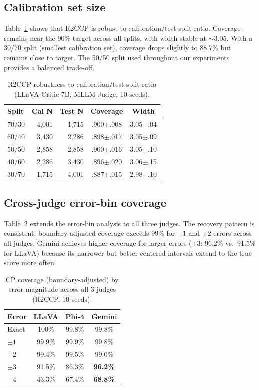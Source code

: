 \documentclass{article}
\begin{document}
\subsection{Calibration set size}
\label{app:split}

Table~\ref{tab:ablation_split} shows that R2CCP is robust to calibration/test split ratio. Coverage remains near the 90\% target across all splits, with width stable at ${\sim}3.05$. With a 30/70 split (smallest calibration set), coverage drops slightly to 88.7\% but remains close to target. The 50/50 split used throughout our experiments provides a balanced trade-off.

\begin{table}[t]
\centering
\caption{R2CCP robustness to calibration/test split ratio (LLaVA-Critic-7B, MLLM-Judge, 10 seeds).}
\label{tab:ablation_split}
\small
\begin{tabular}{lrrcc}
\toprule
\textbf{Split} & \textbf{Cal N} & \textbf{Test N} & \textbf{Coverage} & \textbf{Width} \\
\midrule
70/30 & 4,001 & 1,715 & .900$\pm$.008 & 3.05$\pm$.04 \\
60/40 & 3,430 & 2,286 & .898$\pm$.017 & 3.05$\pm$.09 \\
50/50 & 2,858 & 2,858 & .900$\pm$.016 & 3.05$\pm$.10 \\
40/60 & 2,286 & 3,430 & .896$\pm$.020 & 3.06$\pm$.15 \\
30/70 & 1,715 & 4,001 & .887$\pm$.015 & 2.98$\pm$.10 \\
\bottomrule
\end{tabular}
\end{table}

\subsection{Cross-judge error-bin coverage}
\label{app:cross_judge_errors}

Table~\ref{tab:error_bins_all} extends the error-bin analysis to all three judges. The recovery pattern is consistent: boundary-adjusted coverage exceeds 99\% for $\pm 1$ and $\pm 2$ errors across all judges. Gemini achieves higher coverage for larger errors ($\pm 3$: 96.2\% vs.\ 91.5\% for LLaVA) because its narrower but better-centered intervals extend to the true score more often.

\begin{table}[t]
\centering
\caption{CP coverage (boundary-adjusted) by error magnitude across all 3 judges (R2CCP, 10 seeds).}
\label{tab:error_bins_all}
\small
\begin{tabular}{lccc}
\toprule
\textbf{Error} & \textbf{LLaVA} & \textbf{Phi-4} & \textbf{Gemini} \\
\midrule
Exact & 100\% & 99.8\% & 99.8\% \\
$\pm 1$ & 99.9\% & 99.9\% & 99.8\% \\
$\pm 2$ & 99.4\% & 99.5\% & 99.0\% \\
$\pm 3$ & 91.5\% & 86.3\% & \textbf{96.2\%} \\
$\pm 4$ & 43.3\% & 67.4\% & \textbf{68.8\%} \\
\bottomrule
\end{tabular}
\end{table}
\end{document}
